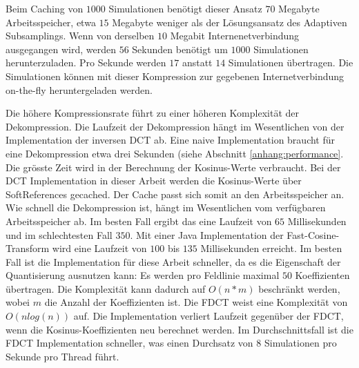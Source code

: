 Beim Caching von $1000$ Simulationen benötigt dieser Ansatz $70$ Megabyte Arbeitsspeicher, etwa $15$ Megabyte weniger als der Lösungsansatz des Adaptiven Subsamplings. Wenn von derselben $10$ Megabit Internenetverbindung ausgegangen wird, werden $56$ Sekunden benötigt um $1000$ Simulationen herunterzuladen. Pro Sekunde werden $17$ anstatt $14$ Simulationen übertragen. Die Simulationen können mit dieser Kompression zur gegebenen Internetverbindung on-the-fly heruntergeladen werden.

Die höhere Kompressionsrate führt zu einer höheren Komplexität der Dekompression. Die Laufzeit der Dekompression hängt im Wesentlichen von der Implementation der inversen DCT ab. Eine naive Implementation braucht für eine Dekompression etwa drei Sekunden (siehe Abschnitt \ref{anhang:performance}. Die grösste Zeit wird in der Berechnung der Kosinus-Werte verbraucht. Bei der DCT Implementation in dieser Arbeit werden die Kosinus-Werte über SoftReferences gecached. Der Cache passt sich somit an den Arbeitsspeicher an. Wie schnell die Dekompression ist, hängt im Wesentlichen vom verfügbaren Arbeitsspeicher ab. Im besten Fall ergibt das eine Laufzeit von $65$ Millisekunden und im schlechtesten Fall $350$. Mit einer Java Implementation der Fast-Cosine-Transform wird eine Laufzeit von $100$ bis $135$ Millisekunden erreicht. Im besten Fall ist die Implementation für diese Arbeit schneller, da es die Eigenschaft der Quantisierung ausnutzen kann: Es werden pro Feldlinie maximal $50$ Koeffizienten übertragen. Die Komplexität kann dadurch auf $O(n*m)$ beschränkt werden, wobei $m$ die Anzahl der Koeffizienten ist. Die FDCT weist eine Komplexität von $O(n log(n))$ auf. Die Implementation verliert Laufzeit gegenüber der FDCT, wenn die Kosinus-Koeffizienten neu berechnet werden. Im Durchschnittsfall ist die FDCT Implementation schneller, was einen Durchsatz von $8$ Simulationen pro Sekunde pro Thread führt.\\